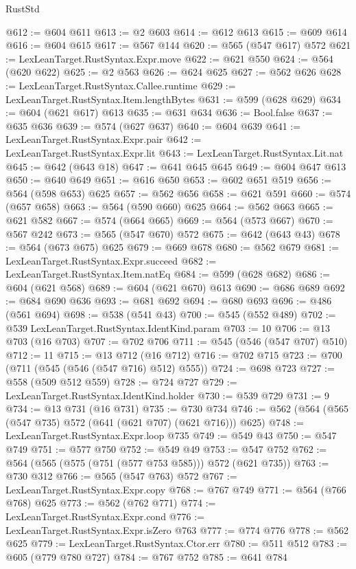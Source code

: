 \begin{lexlean}{RustStd}
\begin{coremodule}
@612 := @604 @611
@613 := @2 @603
@614 := @612 @613
@615 := @609 @614
@616 := @604 @615
@617 := @567 @144
@620 := @565 (@547 @617) @572
@621 := LexLeanTarget.RustSyntax.Expr.move
@622 := @621 @550
@624 := @564 (@620 @622)
@625 := @2 @563
@626 := @624 @625
@627 := @562 @626
@628 := LexLeanTarget.RustSyntax.Callee.runtime
@629 := LexLeanTarget.RustSyntax.Item.lengthBytes
@631 := @599 (@628 @629)
@634 := @604 (@621 @617) @613
@635 := @631 @634
@636 := Bool.false
@637 := @635 @636
@639 := @574 (@627 @637)
@640 := @604 @639
@641 := LexLeanTarget.RustSyntax.Expr.pair
@642 := LexLeanTarget.RustSyntax.Expr.lit
@643 := LexLeanTarget.RustSyntax.Lit.nat
@645 := @642 (@643 @18)
@647 := @641 @645 @645
@649 := @604 @647 @613
@650 := @640 @649
@651 := @616 @650
@653 := @602 @651 @519
@656 := @564 (@598 @653) @625
@657 := @562 @656
@658 := @621 @591
@660 := @574 (@657 @658)
@663 := @564 (@590 @660) @625
@664 := @562 @663
@665 := @621 @582
@667 := @574 (@664 @665)
@669 := @564 (@573 @667)
@670 := @567 @242
@673 := @565 (@547 @670) @572
@675 := @642 (@643 @43)
@678 := @564 (@673 @675) @625
@679 := @669 @678
@680 := @562 @679
@681 := LexLeanTarget.RustSyntax.Expr.succeed
@682 := LexLeanTarget.RustSyntax.Item.natEq
@684 := @599 (@628 @682)
@686 := @604 (@621 @568)
@689 := @604 (@621 @670) @613
@690 := @686 @689
@692 := @684 @690 @636
@693 := @681 @692
@694 := @680 @693
@696 := @486 (@561 @694)
@698 := @538 (@541 @43)
@700 := @545 (@552 @489)
@702 := @539 LexLeanTarget.RustSyntax.IdentKind.param
@703 := 10
@706 := @13 @703 (@16 @703)
@707 := @702 @706
@711 := @545 (@546 (@547 @707) @510)
@712 := 11
@715 := @13 @712 (@16 @712)
@716 := @702 @715
@723 := @700 (@711 (@545 (@546 (@547 @716) @512) @555))
@724 := @698 @723
@727 := @558 (@509 @512 @559)
@728 := @724 @727
@729 := LexLeanTarget.RustSyntax.IdentKind.holder
@730 := @539 @729
@731 := 9
@734 := @13 @731 (@16 @731)
@735 := @730 @734
@746 := @562 (@564 (@565 (@547 @735) @572 (@641 (@621 @707) (@621 @716))) @625)
@748 := LexLeanTarget.RustSyntax.Expr.loop @735
@749 := @549 @43
@750 := @547 @749
@751 := @577 @750
@752 := @549 @49
@753 := @547 @752
@762 := @564 (@565 (@575 (@751 (@577 @753 @585))) @572 (@621 @735))
@763 := @730 @312
@766 := @565 (@547 @763) @572
@767 := LexLeanTarget.RustSyntax.Expr.copy
@768 := @767 @749
@771 := @564 (@766 @768) @625
@773 := @562 (@762 @771)
@774 := LexLeanTarget.RustSyntax.Expr.cond
@776 := LexLeanTarget.RustSyntax.Expr.isZero @763
@777 := @774 @776
@778 := @562 @625
@779 := LexLeanTarget.RustSyntax.Ctor.err
@780 := @511 @512
@783 := @605 (@779 @780 @727)
@784 := @767 @752
@785 := @641 @784

\end{coremodule}
\end{lexlean}
